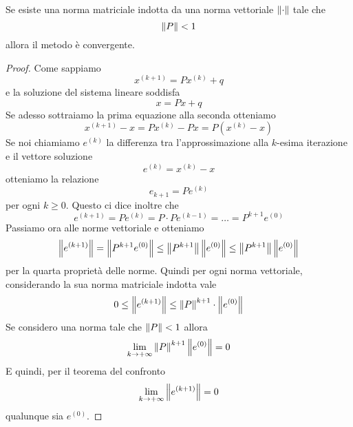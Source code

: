 \begin{theorem}
	Se esiste una norma matriciale indotta da una norma vettoriale $\left\lVert\cdot\right\rVert$ tale che
	\[ \left\lVert P\right\rVert < 1 \]
	allora il metodo è convergente.
	\begin{proof}
		Come sappiamo
		\[ x^{(k+1)} = P x^{(k)} + q \]
		e la soluzione del sistema lineare soddisfa
		\[ x = P x + q \]
		Se adesso sottraiamo la prima equazione alla seconda otteniamo
		\[ x^{(k+1)} - x = P x^{(k)} - P x = P (x^{(k)} - x) \]
		Se noi chiamiamo $e^{(k)}$ la differenza tra l'approssimazione alla $k$-esima iterazione e il vettore
		soluzione
		\[ e^{(k)} = x^{(k)} - x \]
		otteniamo la relazione
		\[ e_{k+1} = P e^{(k)} \]
		per ogni $k \geq 0$. Questo ci dice inoltre che
		\[ e^{(k+1)} = P e^{(k)} = P \cdot P e^{(k-1)} = \dots = P^{k+1} e^{(0)} \]
		Passiamo ora alle norme vettoriale e otteniamo
		\[
			\left\lVert e^{(k+1)}\right\rVert = \left\lVert P^{k+1} e^{(0)}\right\rVert \leq
			\left\lVert P^{k+1}\right\rVert \left\lVert e^{(0)}\right\rVert \leq \left\lVert P^{k+1}\right\rVert \left\lVert e^{(0)}\right\rVert
		\]
		per la quarta proprietà delle norme. Quindi per ogni norma vettoriale, considerando la sua norma
		matriciale indotta vale
		\[ 0 \leq \left\lVert e^{(k+1)}\right\rVert \leq \left\lVert P\right\rVert^{k+1} \cdot \left\lVert e^{(0)}\right\rVert \]
		Se considero una norma tale che $\left\lVert P\right\rVert < 1$ allora
		\[ \lim_{k \to +\infty} \left\lVert P\right\rVert^{k+1} \left\lVert e^{(0)}\right\rVert = 0 \]
		E quindi, per il teorema del confronto
		\[ \lim_{k \to +\infty} \left\lVert e^{(k+1)}\right\rVert = 0 \]
		qualunque sia $e^{(0)}$.
	\end{proof}
\end{theorem}


